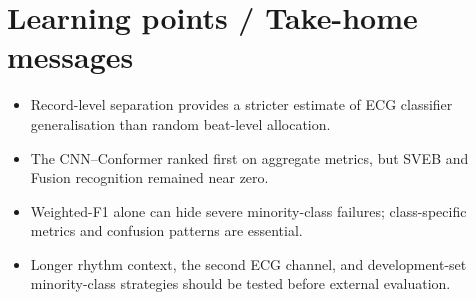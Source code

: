 \section*{Learning points / Take-home messages}
\begin{itemize}
  \item Record-level separation provides a stricter estimate of ECG classifier generalisation than random beat-level allocation.
  \item The CNN--Conformer ranked first on aggregate metrics, but SVEB and Fusion recognition remained near zero.
  \item Weighted-F1 alone can hide severe minority-class failures; class-specific metrics and confusion patterns are essential.
  \item Longer rhythm context, the second ECG channel, and development-set minority-class strategies should be tested before external evaluation.
\end{itemize}
